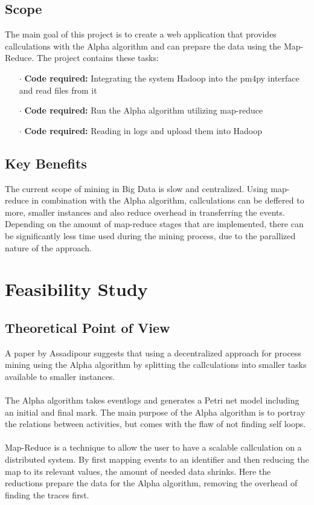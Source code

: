 \documentclass[runningheads]{llncs}
\begin{document}
\subsection{Scope}
The main goal of this project is to create a web application that provides callculations with the Alpha algorithm and can prepare the data using the Map-Reduce. The project contains these tasks:\\
\begin{itemize}
	\item[$\cdot$] \textbf{Code required:} Integrating the system Hadoop into the pm4py interface and read files from it
	\item[$\cdot$] \textbf{Code required:} Run the Alpha algorithm utilizing map-reduce 
	\item[$\cdot$] \textbf{Code required:} Reading in logs and upload them into Hadoop
\end{itemize}

\subsection{Key Benefits}
The current scope of mining in Big Data is slow and centralized. Using map-reduce in combination with the Alpha algorithm, callculations can be deffered to more, smaller instances and also reduce overhead in transferring the events. Depending on the amount of  map-reduce stages that are implemented, there can be significantly less time used during the mining process, due to the parallized nature of the approach. \cite{mapReduce}
\section{Feasibility Study}

\subsection{Theoretical Point of View}
A paper by Assadipour\cite{mapReduce} suggests that using a decentralized approach for process mining using the Alpha algorithm by splitting the callculations into smaller tasks available to smaller instances. \\ \ \\
The Alpha algorithm takes eventlogs and generates a Petri net model including an initial and final mark. The main purpose of the Alpha algorithm is to portray the relations between activities, but comes with the flaw of not finding self loops.  \\ \ \\
Map-Reduce is a technique to allow the user to have a scalable callculation on a distributed system. By first mapping events to an identifier and then reducing the map to its relevant values, the amount of needed data shrinks. Here the reductions prepare the data for the Alpha algorithm, removing the overhead of finding the traces first.
\end{document}
